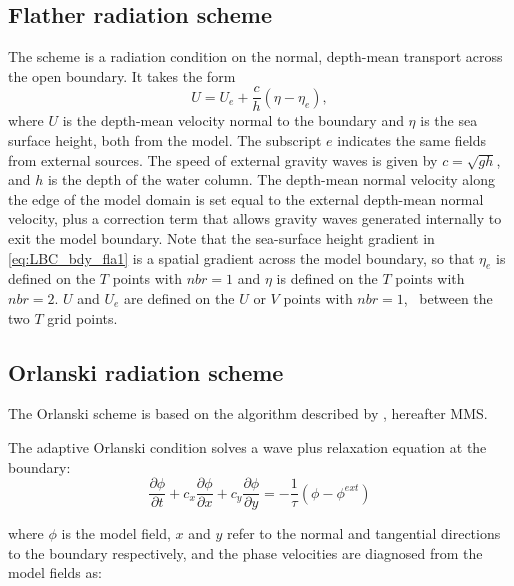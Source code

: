 \documentclass[../main/NEMO_manual]{subfiles}
\begin{document}
\subsection{Flather radiation scheme}
\label{subsec:LBC_bdy_flather_scheme}

The \citet{flather_JPO94} scheme is a radiation condition on the normal,
depth-mean transport across the open boundary.
It takes the form
\begin{equation}
  \label{eq:LBC_bdy_fla1}
  U = U_{e} + \frac{c}{h}\left(\eta - \eta_{e}\right),
\end{equation}
where $U$ is the depth-mean velocity normal to the boundary and $\eta$ is the sea surface height,
both from the model.
The subscript $e$ indicates the same fields from external sources.
The speed of external gravity waves is given by $c = \sqrt{gh}$, and $h$ is the depth of the water column.
The depth-mean normal velocity along the edge of the model domain is set equal to
the external depth-mean normal velocity,
plus a correction term that allows gravity waves generated internally to exit the model boundary.
Note that the sea-surface height gradient in \autoref{eq:LBC_bdy_fla1} is a spatial gradient across the model boundary,
so that $\eta_{e}$ is defined on the $T$ points with $nbr=1$ and $\eta$ is defined on the $T$ points with $nbr=2$.
$U$ and $U_{e}$ are defined on the $U$ or $V$ points with $nbr=1$, \ie\ between the two $T$ grid points.

\subsection{Orlanski radiation scheme}
\label{subsec:LBC_bdy_orlanski_scheme}

The Orlanski scheme is based on the algorithm described by \citep{marchesiello.mcwilliams.ea_OM01}, hereafter MMS.

The adaptive Orlanski condition solves a wave plus relaxation equation at the boundary:
\begin{equation}
  \label{eq:LBC_wave_continuous}
  \frac{\partial\phi}{\partial t} + c_x \frac{\partial\phi}{\partial x} + c_y \frac{\partial\phi}{\partial y} =
  -\frac{1}{\tau}(\phi - \phi^{ext})
\end{equation}

where $\phi$ is the model field, $x$ and $y$ refer to the normal and tangential directions to the boundary respectively, and the phase
velocities are diagnosed from the model fields as:
\end{document}

